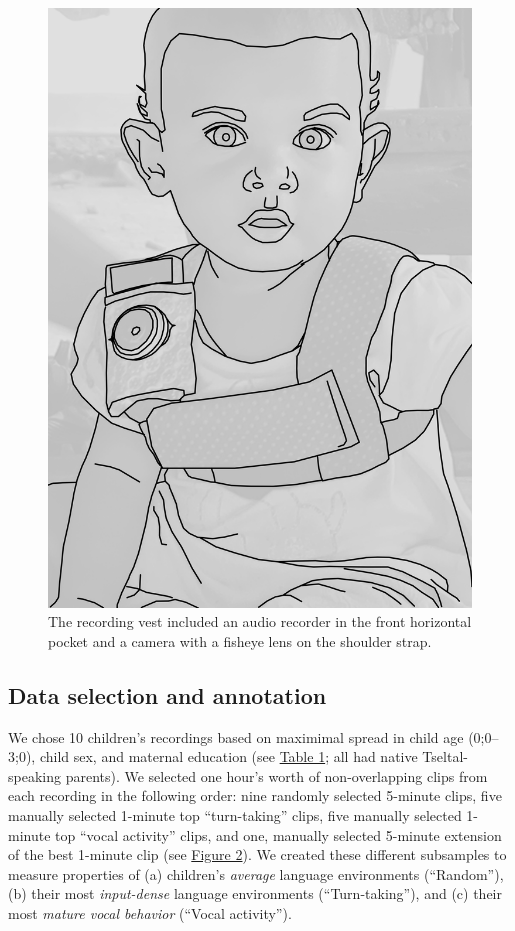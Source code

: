 \documentclass[floatsintext,man]{apa6}
\theoremstyle{definition}
\theoremstyle{definition}
\theoremstyle{definition}
\theoremstyle{remark}
\begin{document}
\begin{figure}

{\centering \includegraphics[width=0.3\linewidth]{Tseltal-CLE_files/TseltalCLE-RecordingVest} 

}

\caption{The recording vest included an audio recorder in the front horizontal pocket and a camera with a fisheye lens on the shoulder strap.}\label{fig:fig1}
\end{figure}

\subsection{Data selection and annotation}\label{methods-samples}

We chose 10 children's recordings based on maximimal spread in child age
(0;0--3;0), child sex, and maternal education (see
\protect\hyperlink{tab1}{Table 1}; all had native Tseltal-speaking
parents). We selected one hour's worth of non-overlapping clips from
each recording in the following order: nine randomly selected 5-minute
clips, five manually selected 1-minute top \enquote{turn-taking} clips,
five manually selected 1-minute top \enquote{vocal activity} clips, and
one, manually selected 5-minute extension of the best 1-minute clip (see
\protect\hyperlink{fig2}{Figure 2}). We created these different
subsamples to measure properties of (a) children's \emph{average}
language environments (\enquote{Random}), (b) their most
\emph{input-dense} language environments (\enquote{Turn-taking}), and
(c) their most \emph{mature vocal behavior} (\enquote{Vocal activity}).
\end{document}
